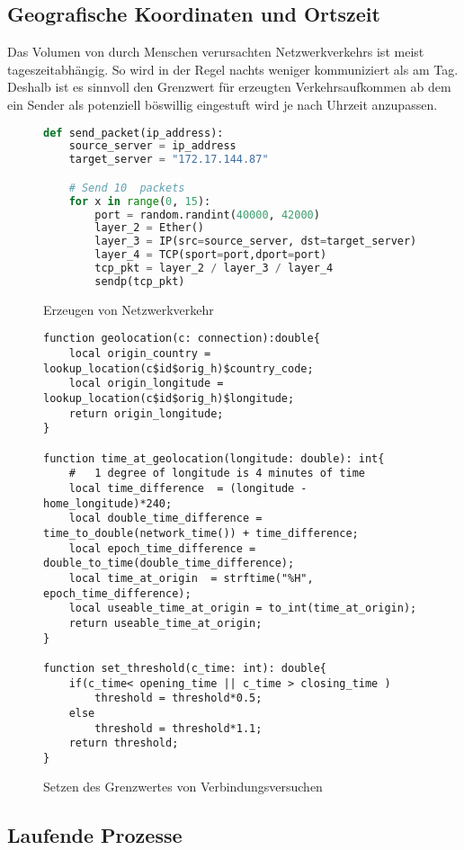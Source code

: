 \subsection{Geografische Koordinaten und Ortszeit}
Das Volumen von durch Menschen verursachten Netzwerkverkehrs ist meist tageszeitabhängig. So wird in der Regel nachts weniger kommuniziert als am Tag.  Deshalb ist es sinnvoll den Grenzwert für erzeugten Verkehrsaufkommen ab dem ein Sender als potenziell böswillig eingestuft wird je nach Uhrzeit anzupassen.\\
\begin{figure}[h!]

\begin{lstlisting}[language=python]
def send_packet(ip_address):
    source_server = ip_address
    target_server = "172.17.144.87"

    # Send 10  packets
    for x in range(0, 15):
        port = random.randint(40000, 42000)
        layer_2 = Ether()
        layer_3 = IP(src=source_server, dst=target_server)
        layer_4 = TCP(sport=port,dport=port)
        tcp_pkt = layer_2 / layer_3 / layer_4
        sendp(tcp_pkt)
\end{lstlisting}
\caption{Erzeugen von Netzwerkverkehr}
\end{figure}

\begin{figure}[h!]
\begin{lstlisting}
function geolocation(c: connection):double{
	local origin_country = lookup_location(c$id$orig_h)$country_code;
	local origin_longitude = lookup_location(c$id$orig_h)$longitude;
	return origin_longitude;
}

function time_at_geolocation(longitude: double): int{
	#	1 degree of longitude is 4 minutes of time
	local time_difference  = (longitude - home_longitude)*240;
	local double_time_difference = time_to_double(network_time()) + time_difference;
	local epoch_time_difference = double_to_time(double_time_difference);
	local time_at_origin  = strftime("%H", epoch_time_difference);
	local useable_time_at_origin = to_int(time_at_origin);
	return useable_time_at_origin;
}

function set_threshold(c_time: int): double{
	if(c_time< opening_time || c_time > closing_time )
		threshold = threshold*0.5;
	else 
		threshold = threshold*1.1;
	return threshold;
}
\end{lstlisting}
\caption{Setzen des Grenzwertes von Verbindungsversuchen}
\end{figure}
\subsection{Laufende Prozesse}
